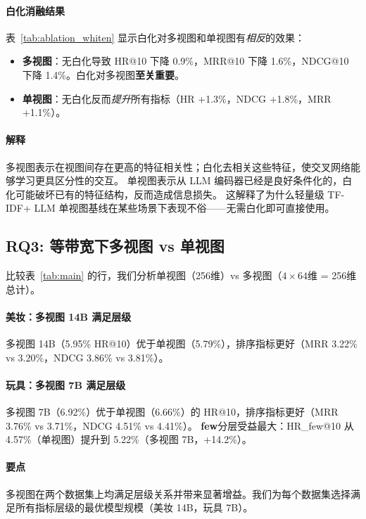 \documentclass[sigconf,natbib=true]{acmart}
\newcommand{\tfidf}{\textsc{TF-IDF}\xspace}
\newcommand{\llm}{\textsc{LLM}\xspace}
\begin{document}
\paragraph{白化消融结果}
表~\ref{tab:ablation_whiten} 显示白化对多视图和单视图有\emph{相反}的效果：
\begin{itemize}[leftmargin=*,itemsep=1pt]
  \item \textbf{多视图}：无白化导致 HR@10 下降 0.9\%，MRR@10 下降 1.6\%，NDCG@10 下降 1.4\%。白化对多视图\textbf{至关重要}。
  \item \textbf{单视图}：无白化反而\emph{提升}所有指标（HR +1.3\%，NDCG +1.8\%，MRR +1.1\%）。
\end{itemize}

\paragraph{解释}
多视图表示在视图间存在更高的特征相关性；白化去相关这些特征，使交叉网络能够学习更具区分性的交互。
单视图表示从 \llm 编码器已经是良好条件化的，白化可能破坏已有的特征结构，反而造成信息损失。
这解释了为什么轻量级 \tfidf + \llm 单视图基线在某些场景下表现不俗——无需白化即可直接使用。

\subsection{RQ3: 等带宽下多视图 vs 单视图}

比较表~\ref{tab:main} 的行，我们分析单视图（256维）vs 多视图（$4\times 64$维 = 256维总计）。

\paragraph{美妆：多视图 14B 满足层级}
多视图 14B（5.95\% HR@10）优于单视图（5.79\%），排序指标更好（MRR 3.22\% vs 3.20\%，NDCG 3.86\% vs 3.81\%）。

\paragraph{玩具：多视图 7B 满足层级}
多视图 7B（6.92\%）优于单视图（6.66\%）的 HR@10，排序指标更好（MRR 3.76\% vs 3.71\%，NDCG 4.51\% vs 4.41\%）。
\textbf{few}分层受益最大：HR\_few@10 从 4.57\%（单视图）提升到 5.22\%（多视图 7B，+14.2\%）。

\paragraph{要点}
多视图在两个数据集上均满足层级关系并带来显著增益。我们为每个数据集选择满足所有指标层级的最优模型规模（美妆 14B，玩具 7B）。
\end{document}
